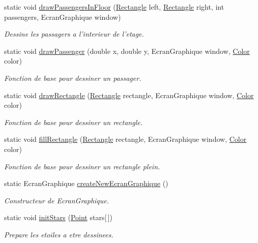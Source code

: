 \begin{DoxyCompactItemize}
static void \hyperlink{classGraphics_acea296716ca092de00953b224cf30513}{draw\-Passengers\-In\-Floor} (\hyperlink{classGraphics_1_1Rectangle}{Rectangle} left, \hyperlink{classGraphics_1_1Rectangle}{Rectangle} right, int passengers, Ecran\-Graphique window)
\begin{DoxyCompactList}\small\item\em Dessine les passagers a l'interieur de l'etage. \end{DoxyCompactList}\item 
static void \hyperlink{classGraphics_a610b075169ec0dc4d213ed67938c14b6}{draw\-Passenger} (double x, double y, Ecran\-Graphique window, \hyperlink{classGraphics_1_1Color}{Color} color)
\begin{DoxyCompactList}\small\item\em Fonction de base pour dessiner un passager. \end{DoxyCompactList}\item 
static void \hyperlink{classGraphics_aa6c7ba1a513cd083fa8ee623794353ea}{draw\-Rectangle} (\hyperlink{classGraphics_1_1Rectangle}{Rectangle} rectangle, Ecran\-Graphique window, \hyperlink{classGraphics_1_1Color}{Color} color)
\begin{DoxyCompactList}\small\item\em Fonction de base pour dessiner un rectangle. \end{DoxyCompactList}\item 
static void \hyperlink{classGraphics_acdb4c64b7fb63fc7296082ce4393a67e}{fill\-Rectangle} (\hyperlink{classGraphics_1_1Rectangle}{Rectangle} rectangle, Ecran\-Graphique window, \hyperlink{classGraphics_1_1Color}{Color} color)
\begin{DoxyCompactList}\small\item\em Fonction de base pour dessiner un rectangle plein. \end{DoxyCompactList}\item 
static Ecran\-Graphique \hyperlink{classGraphics_a8248a417559b11754031f0104d1f2e66}{create\-New\-Ecran\-Graphique} ()
\begin{DoxyCompactList}\small\item\em Constructeur de Ecran\-Graphique. \end{DoxyCompactList}\item 
static void \hyperlink{classGraphics_ad24b32a0c3afa9eec70ba4480a23a3f7}{init\-Stars} (\hyperlink{classGraphics_1_1Point}{Point} stars\mbox{[}$\,$\mbox{]})
\begin{DoxyCompactList}\small\item\em Prepare les etoiles a etre dessinees. \end{DoxyCompactList}\item 

\end{DoxyCompactItemize}
